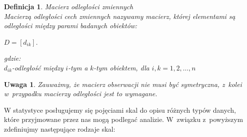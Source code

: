 \documentclass[12pt,a4paper]{report}
\newtheorem{definition}[theorem]{Definicja}
\newtheorem{uwaga}{Uwaga}
\begin{document}
\begin{definition}{Macierz odległości zmiennych \cite[Rozdział 1.6]{panek2013}}\\
Macierzą odległości cech zmiennych nazywamy macierz, której elementami są odległości między parami badanych obiektów: 
\begin{center}
$D = [d_{ik}].$
\end{center}
gdzie:\\
$d_{ik}$-odległość między $i$-tym a $k$-tym obiektem, dla $i,k=1,2,\ldots,n$
\end{definition}

\begin{uwaga}
Zauważmy, że macierz obserwacji nie musi być symetryczna, z~kolei w~przypadku macierzy odległości jest to wymagane.
\end{uwaga}

W statystyce posługujemy się pojęciami skal do opisu różnych typów danych, które przyjmowane przez nas mogą podlegać analizie. W~związku z~powyższym zdefiniujmy następujące rodzaje skal:
\end{document}
